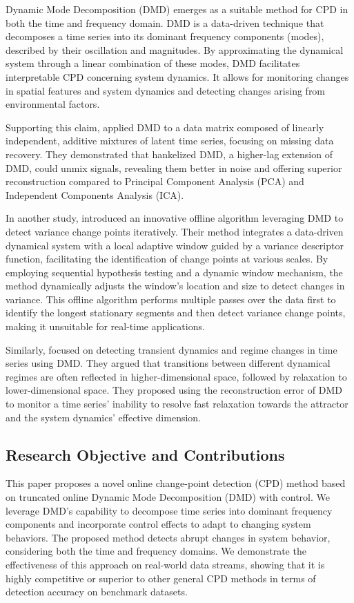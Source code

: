 Dynamic Mode Decomposition (DMD) emerges as a suitable method for CPD in both the time and frequency domain. DMD is a data-driven technique that decomposes a time series into its dominant frequency components (modes), described by their oscillation and magnitudes. By approximating the dynamical system through a linear combination of these modes, DMD facilitates interpretable CPD concerning system dynamics. It allows for monitoring changes in spatial features and system dynamics and detecting changes arising from environmental factors.

Supporting this claim, \citet{Prasadan2020} applied DMD to a data matrix composed of linearly independent, additive mixtures of latent time series, focusing on missing data recovery. They demonstrated that hankelized DMD, a higher-lag extension of DMD, could unmix signals, revealing them better in noise and offering superior reconstruction compared to Principal Component Analysis (PCA) and Independent Components Analysis (ICA).

In another study, \citet{Srivastava2017} introduced an innovative offline algorithm leveraging DMD to detect variance change points iteratively. Their method integrates a data-driven dynamical system with a local adaptive window guided by a variance descriptor function, facilitating the identification of change points at various scales. By employing sequential hypothesis testing and a dynamic window mechanism, the method dynamically adjusts the window's location and size to detect changes in variance. This offline algorithm performs multiple passes over the data first to identify the longest stationary segments and then detect variance change points, making it unsuitable for real-time applications.

Similarly, \citet{Gottwald2020} focused on detecting transient dynamics and regime changes in time series using DMD. They argued that transitions between different dynamical regimes are often reflected in higher-dimensional space, followed by relaxation to lower-dimensional space. They proposed using the reconstruction error of DMD to monitor a time series' inability to resolve fast relaxation towards the attractor and the system dynamics' effective dimension.

\subsection{Research Objective and Contributions}
This paper proposes a novel online change-point detection (CPD) method based on truncated online Dynamic Mode Decomposition (DMD) with control. We leverage DMD's capability to decompose time series into dominant frequency components and incorporate control effects to adapt to changing system behaviors. The proposed method detects abrupt changes in system behavior, considering both the time and frequency domains. We demonstrate the effectiveness of this approach on real-world data streams, showing that it is highly competitive or superior to other general CPD methods in terms of detection accuracy on benchmark datasets.


